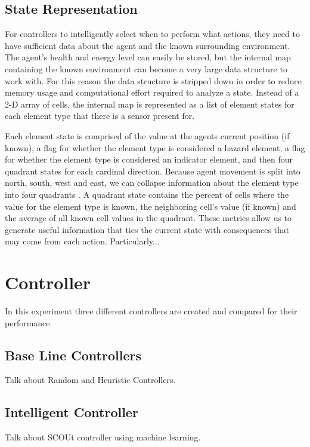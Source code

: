 \subsection{State Representation}
For controllers to intelligently select when to perform what actions, they need to have sufficient data about the agent and the known surrounding environment.
The agent's health and energy level can easily be stored, but the internal map containing the known environment can become a very large data structure to work with.
For this reason the data structure is stripped down in order to reduce memory usage and computational effort required to analyze a state.
Instead of a 2-D array of cells,  the internal map is represented as a list of element states for each element type that there is a sensor present for.

Each element state is comprised of the value at the agents current position (if known), a flag for whether the element type is considered a hazard element, a flag for whether the element type is considered an indicator element, and then four quadrant states for each cardinal direction.
Because agent movement is split into north, south, west and east, we can collapse information about the element type into four quadrants .
A quadrant state contains the percent of cells where the value for the element type is known, the neighboring cell's value (if known) and the average of all known cell values in the quadrant.
These metrics allow us to generate useful information that ties the current state with consequences that may come from each action.
Particularly...



\section{Controller}
In this experiment three different controllers are created and compared for their performance.

\subsection{Base Line Controllers}
Talk about Random and Heuristic Controllers.

\subsection{Intelligent Controller}
Talk about SCOUt controller using machine learning.

